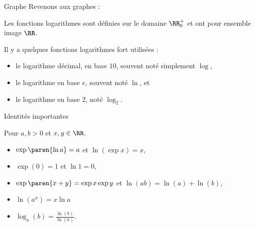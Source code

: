 \documentclass[french,xcolor=svgnames]{beamer}
\begin{document}
\begin{frame}{Graphe}
  Revenons aux graphes :\pause{}
  \begin{center}
  \end{center}
\end{frame}

\begin{frame}
  Les fonctions logarithmes sont définies sur le domaine $\RR_0^+$ et ont pour ensemble image $\RR$.
  \pause
  
  Il y a quelques fonctions logarithmes fort utilisées :\pause{}
  \begin{itemize}
  \item le logarithme décimal, en base $10$, souvent noté simplement $\log$,\pause{}
  \item le logarithme en base $e$, souvent noté $\ln$, et\pause{}
  \item le logarithme en base $2$, noté $\log_{2}$.
  \end{itemize}
\end{frame}

\begin{frame}{Identités importantes}\label{expologimportantid}
  \begin{proposition}
    Pour $a, b > 0$ et $x, y \in \RR$.
    \begin{itemize}
    \item $\exp\paren{{\ln a}} = a$ et $\ln(\exp x) = x$,\pause{}
    \item $\exp (0) = 1$ et $\ln 1 = 0$,\pause{}
    \item $\exp\paren{x+y} = \exp x \exp y$\pause{} et $\ln(a b) = \ln(a) + \ln(b)$,\pause{}
    \item $\ln (a^x) = x \ln a$\pause{}
    \item $\log_{a}(b) = \frac{\ln(b)}{\ln(a)}$.
    \end{itemize}
  \end{proposition}
\end{frame}
\end{document}
